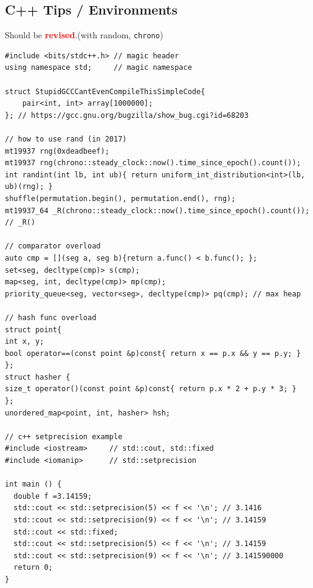 \documentclass[landscape, 8pt, a4paper, oneside, twocolumn]{extarticle}
\newcommand{\revised}{Should be \textcolor{red}{\textbf{revised}}.}
\begin{document}
\subsection {C++ Tips / Environments}
\revised (with random, \verb|chrono|)
\begin{verbatim}
#include <bits/stdc++.h> // magic header
using namespace std;     // magic namespace

struct StupidGCCCantEvenCompileThisSimpleCode{
	pair<int, int> array[1000000];
}; // https://gcc.gnu.org/bugzilla/show_bug.cgi?id=68203

// how to use rand (in 2017)
mt19937 rng(0xdeadbeef);
mt19937 rng(chrono::steady_clock::now().time_since_epoch().count());
int randint(int lb, int ub){ return uniform_int_distribution<int>(lb, ub)(rng); }
shuffle(permutation.begin(), permutation.end(), rng);
mt19937_64 _R(chrono::steady_clock::now().time_since_epoch().count()); // _R()

// comparator overload
auto cmp = [](seg a, seg b){return a.func() < b.func(); };
set<seg, decltype(cmp)> s(cmp); 
map<seg, int, decltype(cmp)> mp(cmp);
priority_queue<seg, vector<seg>, decltype(cmp)> pq(cmp); // max heap

// hash func overload
struct point{
int x, y;
bool operator==(const point &p)const{ return x == p.x && y == p.y; }
};
struct hasher {
size_t operator()(const point &p)const{ return p.x * 2 + p.y * 3; }
};
unordered_map<point, int, hasher> hsh;

// c++ setprecision example
#include <iostream>     // std::cout, std::fixed
#include <iomanip>      // std::setprecision

int main () {
  double f =3.14159;
  std::cout << std::setprecision(5) << f << '\n'; // 3.1416
  std::cout << std::setprecision(9) << f << '\n'; // 3.14159
  std::cout << std::fixed;
  std::cout << std::setprecision(5) << f << '\n'; // 3.14159
  std::cout << std::setprecision(9) << f << '\n'; // 3.141590000
  return 0;
}
\end{verbatim}

\end{document}
